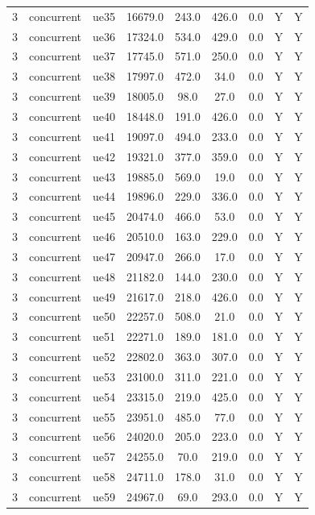 \begin{table}[ht]
\begin{tabular}{|c|c|c|c|c|c|c|c|c|}
3 & concurrent & ue35 & 16679.0 & 243.0 & 426.0 & 0.0 & Y & Y \\
3 & concurrent & ue36 & 17324.0 & 534.0 & 429.0 & 0.0 & Y & Y \\
3 & concurrent & ue37 & 17745.0 & 571.0 & 250.0 & 0.0 & Y & Y \\
3 & concurrent & ue38 & 17997.0 & 472.0 & 34.0 & 0.0 & Y & Y \\
3 & concurrent & ue39 & 18005.0 & 98.0 & 27.0 & 0.0 & Y & Y \\
3 & concurrent & ue40 & 18448.0 & 191.0 & 426.0 & 0.0 & Y & Y \\
3 & concurrent & ue41 & 19097.0 & 494.0 & 233.0 & 0.0 & Y & Y \\
3 & concurrent & ue42 & 19321.0 & 377.0 & 359.0 & 0.0 & Y & Y \\
3 & concurrent & ue43 & 19885.0 & 569.0 & 19.0 & 0.0 & Y & Y \\
3 & concurrent & ue44 & 19896.0 & 229.0 & 336.0 & 0.0 & Y & Y \\
3 & concurrent & ue45 & 20474.0 & 466.0 & 53.0 & 0.0 & Y & Y \\
3 & concurrent & ue46 & 20510.0 & 163.0 & 229.0 & 0.0 & Y & Y \\
3 & concurrent & ue47 & 20947.0 & 266.0 & 17.0 & 0.0 & Y & Y \\
3 & concurrent & ue48 & 21182.0 & 144.0 & 230.0 & 0.0 & Y & Y \\
3 & concurrent & ue49 & 21617.0 & 218.0 & 426.0 & 0.0 & Y & Y \\
3 & concurrent & ue50 & 22257.0 & 508.0 & 21.0 & 0.0 & Y & Y \\
3 & concurrent & ue51 & 22271.0 & 189.0 & 181.0 & 0.0 & Y & Y \\
3 & concurrent & ue52 & 22802.0 & 363.0 & 307.0 & 0.0 & Y & Y \\
3 & concurrent & ue53 & 23100.0 & 311.0 & 221.0 & 0.0 & Y & Y \\
3 & concurrent & ue54 & 23315.0 & 219.0 & 425.0 & 0.0 & Y & Y \\
3 & concurrent & ue55 & 23951.0 & 485.0 & 77.0 & 0.0 & Y & Y \\
3 & concurrent & ue56 & 24020.0 & 205.0 & 223.0 & 0.0 & Y & Y \\
3 & concurrent & ue57 & 24255.0 & 70.0 & 219.0 & 0.0 & Y & Y \\
3 & concurrent & ue58 & 24711.0 & 178.0 & 31.0 & 0.0 & Y & Y \\
3 & concurrent & ue59 & 24967.0 & 69.0 & 293.0 & 0.0 & Y & Y \\

\end{tabular}
\end{table}
